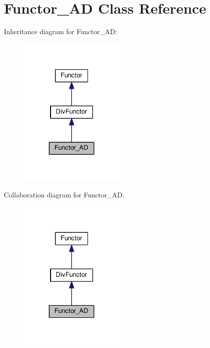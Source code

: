 \hypertarget{classFunctor__AD}{}\section{Functor\+\_\+\+AD Class Reference}
\label{classFunctor__AD}


Inheritance diagram for Functor\+\_\+\+AD\+:
\nopagebreak
\begin{figure}[H]
\begin{center}
\leavevmode
\includegraphics[width=149pt]{classFunctor__AD__inherit__graph}
\end{center}
\end{figure}


Collaboration diagram for Functor\+\_\+\+AD\+:
\nopagebreak
\begin{figure}[H]
\begin{center}
\leavevmode
\includegraphics[width=149pt]{classFunctor__AD__coll__graph}
\end{center}
\end{figure}
